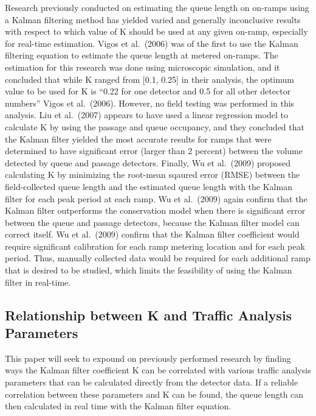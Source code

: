 \documentclass[numbered]{trbarticle}
\begin{document}
Research previously conducted on estimating the queue length on on-ramps using a Kalman filtering method has yielded varied and generally inconclusive results with respect to which value of K should be used at any given on-ramp, especially for real-time estimation. Vigos et al.~(2006) was of the first to use the Kalman filtering equation to estimate the queue length at metered on-ramps. The estimation for this research was done using microscopic simulation, and it concluded that while K ranged from {[}0.1, 0.25{]} in their analysis, the optimum value to be used for K is ``0.22 for one detector and 0.5 for all other detector numbers'' Vigos et al.~(2006). However, no field testing was performed in this analysis. Liu et al.~(2007) appears to have used a linear regression model to calculate K by using the passage and queue occupancy, and they concluded that the Kalman filter yielded the most accurate results for ramps that were determined to have significant error (larger than 2 percent) between the volume detected by queue and passage detectors. Finally, Wu et al.~(2009) proposed calculating K by minimizing the root-mean sqaured error (RMSE) between the field-collected queue length and the estimated queue length with the Kalman filter for each peak period at each ramp. Wu et al.~(2009) again confirm that the Kalman filter outperforms the conservation model when there is significant error between the queue and passage detectors, because the Kalman filter model can correct itself. Wu et al.~(2009) confirm that the Kalman filter coefficient would require significant calibration for each ramp metering location and for each peak period. Thus, manually collected data would be required for each additional ramp that is desired to be studied, which limits the feasibility of using the Kalman filter in real-time.

\hypertarget{relationship-between-k-and-traffic-analysis-parameters}{%
\subsection{Relationship between K and Traffic Analysis Parameters}\label{relationship-between-k-and-traffic-analysis-parameters}}

This paper will seek to expound on previously performed research by finding ways the Kalman filter coefficient K can be correlated with various traffic analysis parameters that can be calculated directly from the detector data. If a reliable correlation between these parameters and K can be found, the queue length can then calculated in real time with the Kalman filter equation.
\end{document}
